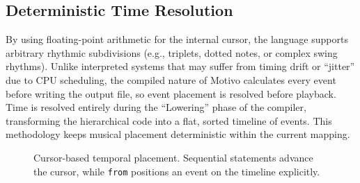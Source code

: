 \subsection{Deterministic Time Resolution}\label{detail-subsec:deterministic-time-resolution}

By using floating-point arithmetic for the internal cursor, the language supports arbitrary rhythmic subdivisions
(e.g., triplets, dotted notes, or complex swing rhythms).
Unlike interpreted systems that may suffer from timing drift or ``jitter'' due to CPU scheduling, the compiled nature of
Motivo calculates every event before writing the output file, so event placement is resolved before playback.
Time is resolved entirely during the ``Lowering'' phase of the compiler, transforming the hierarchical code into a flat,
sorted timeline of events.
This methodology keeps musical placement deterministic within the current mapping.

\begin{figure}[htbp]
  \centering
  \caption{Cursor-based temporal placement.
    Sequential statements advance the cursor, while \texttt{from} positions an event on the timeline
  explicitly.}\label{fig:cursor-model}
\end{figure}
